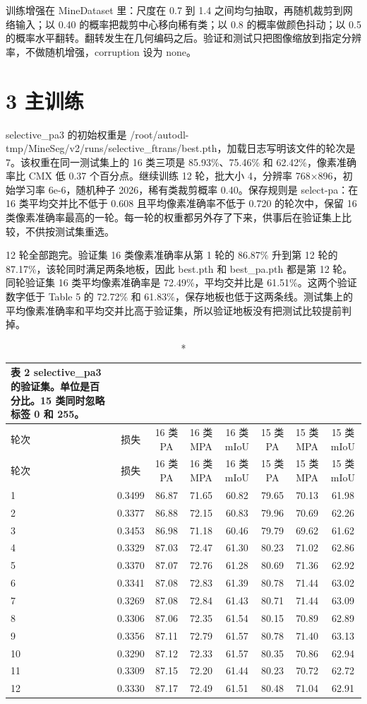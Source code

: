 \documentclass[11pt]{article}
\begin{document}
训练增强在 MineDataset 里：尺度在 0.7 到 1.4 之间均匀抽取，再随机裁剪到网络输入；以 0.40 的概率把裁剪中心移向稀有类；以 0.8 的概率做颜色抖动；以 0.5 的概率水平翻转。翻转发生在几何编码之后。验证和测试只把图像缩放到指定分辨率，不做随机增强，corruption 设为 none。

\section*{3  主训练}
selective\_pa3 的初始权重是 /root/autodl-tmp/MineSeg/v2/runs/selective\_ftrans/best.pth，加载日志写明该文件的轮次是 7。该权重在同一测试集上的 16 类三项是 85.93\%、75.46\% 和 62.42\%，像素准确率比 CMX 低 0.37 个百分点。继续训练 12 轮，批大小 4，分辨率 768×896，初始学习率 6e-6，随机种子 2026，稀有类裁剪概率 0.40。保存规则是 select-pa：在 16 类平均交并比不低于 0.608 且平均像素准确率不低于 0.720 的轮次中，保留 16 类像素准确率最高的一轮。每一轮的权重都另外存了下来，供事后在验证集上比较，不供按测试集重选。

12 轮全部跑完。验证集 16 类像素准确率从第 1 轮的 86.87\% 升到第 12 轮的 87.17\%，该轮同时满足两条地板，因此 best.pth 和 best\_pa.pth 都是第 12 轮。同轮验证集 16 类平均像素准确率是 72.49\%，平均交并比是 61.51\%。这两个验证数字低于 Table 5 的 72.72\% 和 61.83\%，保存地板也低于这两条线。测试集上的平均像素准确率和平均交并比高于验证集，所以验证地板没有把测试比较提前判掉。

{\footnotesize\setlength{\tabcolsep}{3pt}
\begin{longtable}{lccccccc}
\caption*{表 2  selective\_pa3 的验证集。单位是百分比。15 类同时忽略标签 0 和 255。}\\
\toprule
轮次 & 损失 & 16 类 PA & 16 类 MPA & 16 类 mIoU & 15 类 PA & 15 类 MPA & 15 类 mIoU\\
\midrule
\endfirsthead
\toprule
轮次 & 损失 & 16 类 PA & 16 类 MPA & 16 类 mIoU & 15 类 PA & 15 类 MPA & 15 类 mIoU\\
\midrule
\endhead
1 & 0.3499 & 86.87 & 71.65 & 60.82 & 79.65 & 70.13 & 61.98\\
2 & 0.3377 & 86.88 & 72.15 & 60.83 & 79.96 & 70.69 & 62.26\\
3 & 0.3453 & 86.98 & 71.18 & 60.46 & 79.79 & 69.62 & 61.62\\
4 & 0.3329 & 87.03 & 72.47 & 61.30 & 80.23 & 71.02 & 62.86\\
5 & 0.3370 & 87.07 & 72.76 & 61.28 & 80.69 & 71.36 & 62.92\\
6 & 0.3341 & 87.08 & 72.83 & 61.39 & 80.78 & 71.44 & 63.02\\
7 & 0.3269 & 87.08 & 72.84 & 61.43 & 80.71 & 71.44 & 63.09\\
8 & 0.3306 & 87.06 & 72.35 & 61.54 & 80.15 & 70.89 & 62.89\\
9 & 0.3356 & 87.11 & 72.79 & 61.57 & 80.78 & 71.40 & 63.13\\
10 & 0.3290 & 87.12 & 72.33 & 61.57 & 80.35 & 70.86 & 62.94\\
11 & 0.3309 & 87.15 & 72.20 & 61.44 & 80.23 & 70.72 & 62.72\\
12 & 0.3330 & 87.17 & 72.49 & 61.51 & 80.48 & 71.04 & 62.91\\
\bottomrule
\end{longtable}
}
\end{document}
